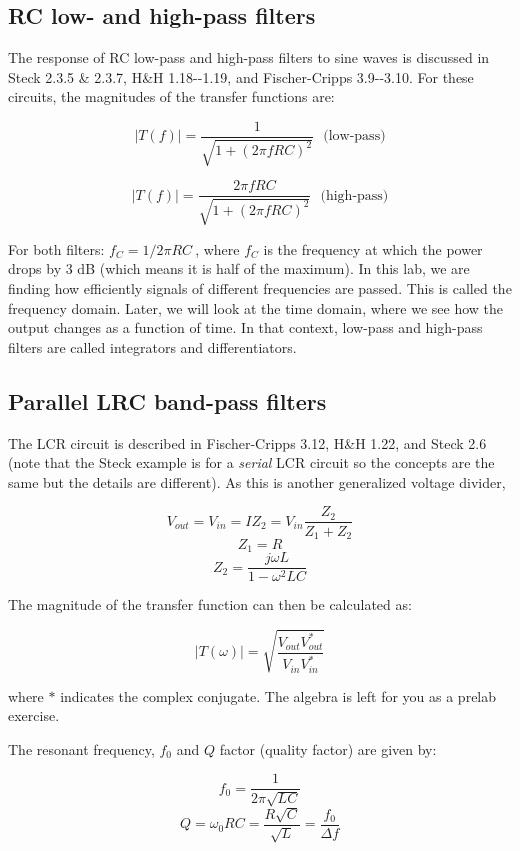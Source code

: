 \documentclass[10pt]{PhysLab1C} %
\begin{document}
\subsection{RC low- and high-pass filters}

The response of RC low-pass and high-pass filters to sine waves is
discussed in Steck 2.3.5 \& 2.3.7, H\&H 1.18-\/-1.19, and Fischer-Cripps
3.9-\/-3.10. For these circuits, the magnitudes of the transfer
functions are:

\[\left| T(f) \right| = \frac{1}{\sqrt{1 + (2\pi fRC)^{2}}} 
~~~\mbox{(low-pass)}
\]

\[\left| T(f) \right| = \frac{2\pi fRC}{\sqrt{1 + (2\pi fRC)^{2}}}
~~~\mbox{(high-pass)}\]

For both filters: \(f_{C} = 1/{2\pi RC}\ \), where \(f_{C}\) is the
frequency at which the power drops by 3 dB (which means it is half of
the maximum). In this lab, we are finding how efficiently signals of
different frequencies are passed. This is called the frequency domain.
Later, we will look at the time domain, where we see how the output
changes as a function of time. In that context, low-pass and high-pass
filters are called integrators and differentiators.

\subsection{Parallel LRC band-pass filters}

The LCR circuit is described in Fischer-Cripps 3.12, H\&H 1.22, and
Steck 2.6 (note that the Steck example is for a \emph{serial} LCR
circuit so the concepts are the same but the details are different). As
this is another generalized voltage divider,

\[V_{out} = V_{in} = IZ_{2} = V_{in}\frac{Z_{2}}{Z_{1} + Z_{2}} \]
\[Z_{1} = R\]
\[Z_{2} = \frac{j\omega L}{1 - \omega^{2}LC}\]

The magnitude of the transfer function can then be calculated as:

\[\left| T(\omega) \right| = \sqrt{\frac{V_{out}V_{out}^{*}}{V_{in}V_{in}^{*}}}\]

where \(*\) indicates the complex conjugate. The algebra is left for you
as a prelab exercise.

The resonant frequency, $f_0$ and $Q$ factor (quality factor) are given by:

\[f_{0} = \frac{1}{2\pi\sqrt{LC}}\]
\[Q = \omega_{0}RC = \frac{R\sqrt{C}}{\sqrt{L}} = \frac{f_{0}}{\Delta f}\]
\end{document}
